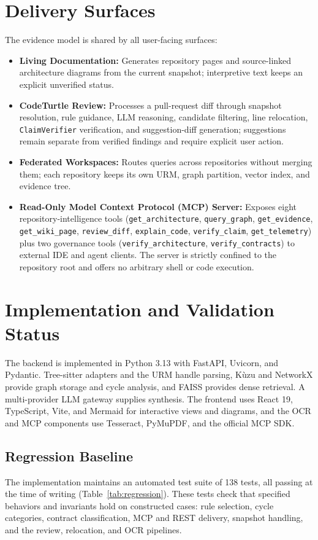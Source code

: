 \documentclass[runningheads]{llncs}
\begin{document}
\section{Delivery Surfaces}
The evidence model is shared by all user-facing surfaces:
\begin{itemize}
    \item \textbf{Living Documentation:} Generates repository pages and source-linked architecture diagrams from the current snapshot; interpretive text keeps an explicit unverified status.
    \item \textbf{CodeTurtle Review:} Processes a pull-request diff through snapshot resolution, rule guidance, LLM reasoning, candidate filtering, line relocation, \texttt{ClaimVerifier} verification, and suggestion-diff generation; suggestions remain separate from verified findings and require explicit user action.
    \item \textbf{Federated Workspaces:} Routes queries across repositories without merging them; each repository keeps its own URM, graph partition, vector index, and evidence tree.
    \item \textbf{Read-Only Model Context Protocol (MCP) Server:} Exposes eight repository-intelligence tools (\texttt{get\_architecture}, \texttt{query\_graph}, \texttt{get\_evidence}, \texttt{get\_wiki\_page}, \texttt{review\_diff}, \texttt{explain\_code}, \texttt{verify\_claim}, \texttt{get\_telemetry}) plus two governance tools (\texttt{verify\_architecture}, \texttt{verify\_contracts}) to external IDE and agent clients. The server is strictly confined to the repository root and offers no arbitrary shell or code execution.
\end{itemize}

\section{Implementation and Validation Status}
\label{sec:implementation}
The backend is implemented in Python 3.13 with FastAPI, Uvicorn, and Pydantic. Tree-sitter adapters and the URM handle parsing, Kùzu and NetworkX provide graph storage and cycle analysis, and FAISS provides dense retrieval. A multi-provider LLM gateway supplies synthesis. The frontend uses React 19, TypeScript, Vite, and Mermaid for interactive views and diagrams, and the OCR and MCP components use Tesseract, PyMuPDF, and the official MCP SDK.

\subsection{Regression Baseline}
The implementation maintains an automated test suite of 138 tests, all passing at the time of writing (Table~\ref{tab:regression}). These tests check that specified behaviors and invariants hold on constructed cases: rule selection, cycle categories, contract classification, MCP and REST delivery, snapshot handling, and the review, relocation, and OCR pipelines. 
\end{document}
